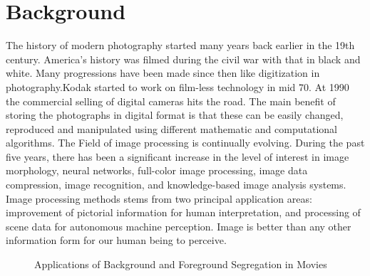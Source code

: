 \section{Background}
The history of modern photography started many years back earlier in the 19th century. America’s history was filmed during the civil war with that in black and white. Many progressions have been made since then like digitization in photography.Kodak started to work on film-less technology in mid 70. At 1990 the commercial selling of digital cameras hits the road. The main benefit of storing the photographs in digital format is that these can be easily changed, reproduced and manipulated using different mathematic and computational algorithms. The Field of image processing is continually evolving. During the past five years, there has been a significant increase in the level of interest in image morphology, neural networks, full-color image processing, image data compression, image recognition, and knowledge-based image analysis systems. Image processing methods stems from two principal application areas: improvement of pictorial information for human interpretation, and processing of scene data for autonomous machine perception. Image is better than any other information form for our human being to perceive. 
\begin{figure}[here]%
    \centering
    \qquad
    \caption{Applications of Background and Foreground Segregation in Movies \protect\footnotemark}%
    \label{superpixel}%
\end{figure}
